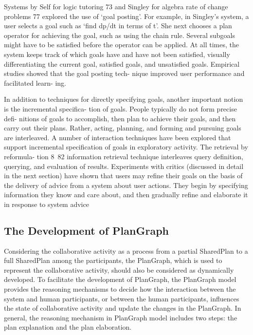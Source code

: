 Systems by Self for logic tutoring 73 and Singley for
algebra rate of change problems 77 explored the use of `goal posting'. For example, in Singley's system, a user selects a goal such as `find dp/dt in terms of t'. She next chooses a plan operator for achieving the goal, such as using the chain rule. Several subgoals might have to be satisfied before the operator can be applied. At all times, the system keeps track of which goals have and have not been satisfied, visually differentiating the current goal, satisfied goals, and unsatisfied goals. Empirical studies showed that the goal posting tech- nique improved user performance and facilitated learn- ing.

In addition to techniques for directly specifying goals,
another important notion is the incremental specifica- tion of goals. People typically do not form precise defi- nitions of goals to accomplish, then plan to achieve their goals, and then carry out their plans. Rather, acting, planning, and forming and pursuing goals are interleaved. A number of interaction techniques have been explored that support incremental specification of goals in exploratory activity. The retrieval by reformula- tion 8~82 information retrieval technique interleaves query definition, querying, and evaluation of results. Experiments with critics (discussed in detail in the next section) have shown that users may refine their goals on the basis of the delivery of advice from a system about user actions. They begin by specifying information they know and care about, and then gradually refine and elaborate it in response to system advice


\subsection{The Development of PlanGraph} %
\label{sub:the_development_of_plangraph}





Considering the collaborative activity as a process from a partial SharedPlan to a full SharedPlan among the participants, the PlanGraph, which is used to represent the collaborative activity, should also be considered as dynamically developed. To facilitate the development of PlanGraph, the PlanGraph model provides the reasoning mechanisms to decide how the interaction between the system and human participants, or between the human participants, influences the state of collaborative activity and update the changes in the PlanGraph. In general, the reasoning mechanism in PlanGraph model includes two steps: the plan explanation and the plan elaboration.

